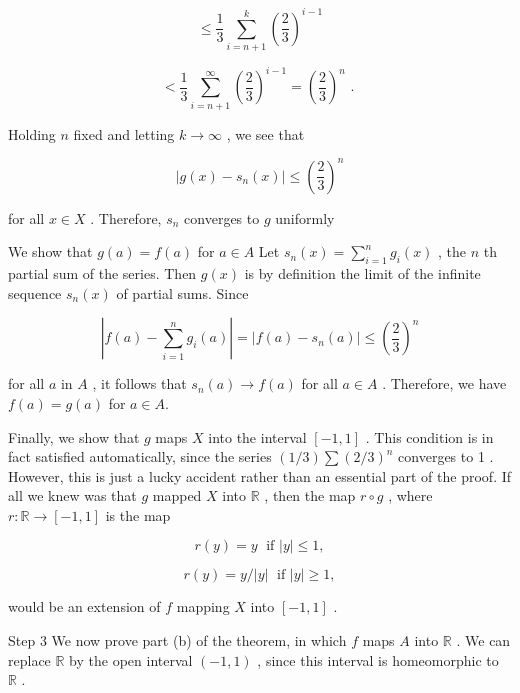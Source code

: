 \documentclass[10pt]{article}
\begin{document}
\[
\leq  \frac{1}{3}\mathop{\sum }\limits_{{i = n + 1}}^{k}{\left( \frac{2}{3}\right) }^{i - 1}
\]

\[
< \frac{1}{3}\mathop{\sum }\limits_{{i = n + 1}}^{\infty }{\left( \frac{2}{3}\right) }^{i - 1} = {\left( \frac{2}{3}\right) }^{n}\text{ . }
\]

Holding \(n\) fixed and letting \(k \rightarrow  \infty\) , we see that

\[
\left| {g\left( x\right)  - {s}_{n}\left( x\right) }\right|  \leq  {\left( \frac{2}{3}\right) }^{n}
\]

for all \(x \in  X\) . Therefore, \({s}_{n}\) converges to \(g\) uniformly

We show that \(g\left( a\right)  = f\left( a\right)\) for \(a \in  A\) Let \({s}_{n}\left( x\right)  = \mathop{\sum }\limits_{{i = 1}}^{n}{g}_{i}\left( x\right)\) , the \(n\) th partial sum of the series. Then \(g\left( x\right)\) is by definition the limit of the infinite sequence \({s}_{n}\left( x\right)\) of partial sums. Since

\[
\left| {f\left( a\right)  - \mathop{\sum }\limits_{{i = 1}}^{n}{g}_{i}\left( a\right) }\right|  = \left| {f\left( a\right)  - {s}_{n}\left( a\right) }\right|  \leq  {\left( \frac{2}{3}\right) }^{n}
\]

for all \(a\) in \(A\) , it follows that \({s}_{n}\left( a\right)  \rightarrow  f\left( a\right)\) for all \(a \in  A\) . Therefore, we have \(f\left( a\right)  = g\left( a\right)\) for \(a \in  A.\)

Finally, we show that \(g\) maps \(X\) into the interval \(\left\lbrack  {-1,1}\right\rbrack\) . This condition is in fact satisfied automatically, since the series \(\left( {1/3}\right) \sum {\left( 2/3\right) }^{n}\) converges to 1 . However, this is just a lucky accident rather than an essential part of the proof. If all we knew was that \(g\) mapped \(X\) into \(\mathbb{R}\) , then the map \(r \circ  g\) , where \(r : \mathbb{R} \rightarrow  \left\lbrack  {-1,1}\right\rbrack\) is the map

\[
r\left( y\right)  = y\;\text{ if }\left| y\right|  \leq  1,
\]

\[
r\left( y\right)  = y/\left| y\right| \;\text{ if }\left| y\right|  \geq  1,
\]

would be an extension of \(f\) mapping \(X\) into \(\left\lbrack  {-1,1}\right\rbrack\) .

Step 3 We now prove part (b) of the theorem, in which \(f\) maps \(A\) into \(\mathbb{R}\) . We can replace \(\mathbb{R}\) by the open interval \(\left( {-1,1}\right)\) , since this interval is homeomorphic to \(\mathbb{R}\) .
\end{document}
